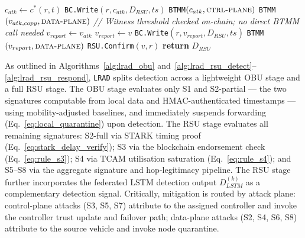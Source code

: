 \documentclass[12pt, a4paper]{report}
\begin{document}
\begin{algorithm}[H]
\caption{\ac{RSU} Attribution \& Response (\texttt{LRAD-RSU-Respond})}
\begin{algorithmic}[1]
\small
{}
      \State $c_{atk} \gets c^*(r,t)$
             \hfill{}
      \State \texttt{BC.Write}$(r,c_{atk},D_{RSU},ts)$
      \State \texttt{BTMM}$(c_{atk},
             \textsc{ctrl-plane})$
             \hfill{}
        \State \texttt{BTMM}$(v_{atk,copy},
               \textsc{data-plane})$
               \hfill{}
      \EndIf
        \State \textit{// Witness threshold checked
               on-chain; no direct BTMM call needed}
      \EndIf
    \Else
      \hfill{}
        \State $v_{report} \gets v_{atk}$
      \Else
        \State $v_{report} \gets v$
      \EndIf
      \State \texttt{BC.Write}$(r,v_{report},
             D_{RSU},ts)$
      \State \texttt{BTMM}$(v_{report},
             \textsc{data-plane})$
    \EndIf
    \State \texttt{RSU.Confirm}$(v,r)$
           \hfill{}
  \EndIf
  \State \textbf{return} $D_{RSU}$
\EndProcedure
\end{algorithmic}
\label{alg:lrad_rsu_respond}
\end{algorithm}

As outlined in Algorithms~\ref{alg:lrad_obu}
and~\ref{alg:lrad_rsu_detect}--\ref{alg:lrad_rsu_respond}, \texttt{LRAD} splits
detection across a lightweight \ac{OBU} stage and a
full \ac{RSU} stage. The \ac{OBU} stage evaluates
only S1 and S2-partial --- the two signatures
computable from local data and \ac{HMAC}-authenticated
timestamps --- using mobility-adjusted baselines, and
immediately suspends forwarding (Eq.~\ref{eq:local_quarantine})
upon detection. The \ac{RSU} stage evaluates all remaining signatures:
S2-full via \ac{STARK} timing proof
(Eq.~\ref{eq:stark_delay_verify}); S3 via the
blockchain endorsement check
(Eq.~\ref{eq:rule_s3}); S4 via \ac{TCAM}
utilisation saturation (Eq.~\ref{eq:rule_s4}); and
S5--S8 via the aggregate signature and hop-legitimacy
pipeline. The \ac{RSU} stage further incorporates the
federated \ac{LSTM} detection output $D_{LSTM}^{(k)}$
as a complementary detection signal. Critically,
mitigation is routed by attack plane: control-plane
attacks (S3, S5, S7) attribute to the assigned
controller and invoke the controller trust update and
failover path; data-plane attacks (S2, S4, S6, S8)
attribute to the source vehicle and invoke node
quarantine.
\end{document}
